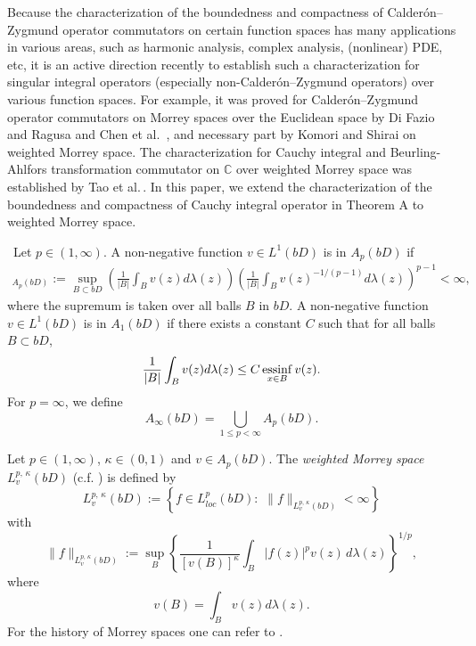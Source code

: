 \documentclass[11pt,a4paper]{amsart}
\numberwithin{equation}{section}
\begin{document}
  \medskip

  Because the characterization of the boundedness and compactness of Calder\'on--Zygmund operator commutators on certain function spaces has many applications in various areas,
  such as harmonic analysis, complex analysis, (nonlinear) PDE, etc, it is an active direction recently to establish such a characterization for  singular integral operators (especially non-Calder\'on--Zygmund operators) over various function spaces. For example, it was proved for Calder\'on--Zygmund operator commutators on Morrey spaces over the Euclidean space by
  Di Fazio and Ragusa \cite{DiFazioRagusa91BUMIA} and Chen et al.\,\cite{CDW12CJM} , and necessary part by Komori and Shirai \cite{KS} on weighted Morrey space. The characterization for
  Cauchy integral and Beurling-Ahlfors transformation commutator on $\mathbb C$ over weighted Morrey space was established by Tao et al.\,\cite{TYY,TYY2}.
   In this paper, we extend the characterization of the boundedness and compactness of  Cauchy integral operator in Theorem A to weighted Morrey space.



\ Let $p\in (1,\infty)$.  A non-negative function $v\in L^1(bD)$ is in  $A_{p}(bD)$ if
\begin{align*}
[v]_{A_p(bD)}:=\sup_{B\subset bD}\left( \frac{1}{|B|}\int_{B}v(z)d\lambda(z)\right) \left( \frac{1}{|B|}%
\int_{B}v(z) ^{-1/(p-1)}d\lambda(z)\right) ^{p-1}<\infty,
\end{align*}
where the supremum is taken over all balls $B$ in $bD$.
A non-negative function $v\in L^1(bD)$ is in  $A_{1}(bD)$ if there exists a constant $C$
such that for all balls $B\subset bD$,
\begin{equation*}
\frac{1}{|B|}\int_{B}v( z) d\lambda(z)\leq C\mathop{\rm essinf}%
\limits_{x\in B}v(z) .
\end{equation*}%
For $p=\infty$, we define
\begin{equation*}
A_{\infty }(bD)= \bigcup_{1\leq p<\infty }A_{p}(bD).
\end{equation*}


Let $p\in(1,\infty)$, $\kappa\in(0,1)$ and $v\in A_p(bD)$.
The \emph{weighted Morrey space} $L_v^{p,\,\kappa}(bD)$ (c.f. \cite{Kok} )
 is defined by
\begin{equation*}
L_v^{p,\,\kappa}(bD):=\left\{f\in L_{loc}^{p}(bD):\,\,\|f\|_{L_v^{p,\,\kappa}(bD)}<\infty\right\}
\end{equation*}
with
\begin{equation*}
\|f\|_{L_v^{p,\,\kappa}(bD)}:=\sup_{B}
\left\{\frac{1}{[v(B)]^\kappa}\int_{B}|f(z)|^pv(z)\,d\lambda(z)\right\}^{1/p},
\end{equation*}
where
$$v(B)=\int_B v(z)d\lambda(z).$$
For the history of Morrey spaces one can refer to \cite{AX}.
\end{document}
